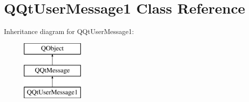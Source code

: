 \hypertarget{class_q_qt_user_message1}{}\section{Q\+Qt\+User\+Message1 Class Reference}
\label{class_q_qt_user_message1}
Inheritance diagram for Q\+Qt\+User\+Message1\+:\begin{figure}[H]
\begin{center}
\leavevmode
\includegraphics[height=3.000000cm]{class_q_qt_user_message1}
\end{center}
\end{figure}
